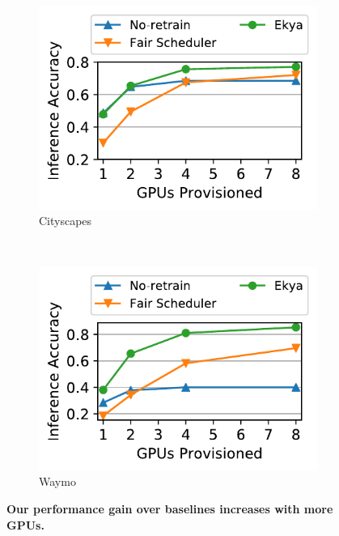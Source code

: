 \begin{figure}
  \centering
  \begin{subfigure}[t]{0.5\linewidth}
    \centering
    \includegraphics[width=\linewidth]{results/multicam/multicam_acc_vs_res_cityscapes.pdf} 
    \caption{\small Cityscapes}
    \label{fig:scalability-gpus-cityscapes}
  \end{subfigure}
  ~~~
  \begin{subfigure}[t]{0.5\linewidth}
    \centering
    \includegraphics[width=\linewidth]{results/multicam/multicam_acc_vs_res_waymo.pdf}
     \caption{\small Waymo}
    \label{fig:scalability-gpus-waymo}
  \end{subfigure}
  \caption{\small \bf Our performance gain over baselines increases with more GPUs. }
  \label{fig:scalability-gpus}
\end{figure}

